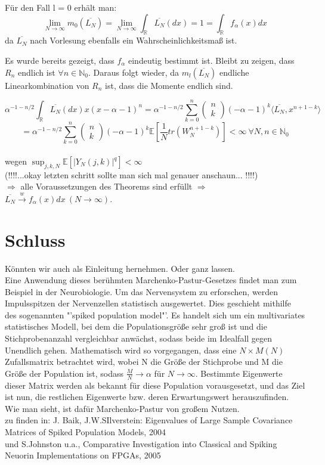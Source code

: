 \documentclass[a4paper, 11pt]{scrreprt}
\newcommand{\RR}{\mathbb{R}}
\newcommand{\EE}{\mathbb{E}}
\newcommand{\NN}{\mathbb{N}}
\begin{document}
Für den Fall l = 0 erhält man:
\[\lim_{N \to \infty} m_0(\overline{L_{N}}) 
= \lim_{N \to \infty} \int_\RR \overline{L_{N}}(dx) = 1 
= \int_\RR f_\alpha(x)dx\]
da $ \overline{L_N} $ nach Vorlesung ebenfalls ein Wahrscheinlichkeitsmaß ist.

Es wurde bereits gezeigt, dass $ f_\alpha $ eindeutig bestimmt ist. 
Bleibt zu zeigen, dass $ R_n $ endlich ist $ \forall n \in \NN_0 $. Daraus folgt wieder, da $ m_l(\overline{L_N}) $ endliche Linearkombination von $R_n$ ist, dass die Momente endlich sind.

 \[ \alpha^{-1-n/2} \int_{\RR}\overline{L_{N}}(dx)x(x-\alpha-1)^{n} = \alpha^{-1-n/2}\sum_{k=0}^n \begin{pmatrix} n\\k\end{pmatrix} (-\alpha -1)^k \langle \overline{L_N}, x^{n+1-k} \rangle \] 
\[= \alpha^{-1-n/2}\sum_{k=0}^n \begin{pmatrix} n\\k\end{pmatrix} (-\alpha -1)^k \EE [\dfrac{1}{N} tr(W_N^{n+1-k})]
< \infty ~\forall N,n \in \NN_0 \]\\
wegen $ \sup_{j,k,N} \EE[\vert Y_N(j,k)\vert ^{q}]< \infty$ \\
(!!!!...okay letzten schritt sollte man sich mal genauer anschaun... !!!!)\\
$ \Rightarrow $ alle Voraussetzungen des Theorems sind erfüllt $ \Rightarrow $  $ \overline{L_N} \overset{w}{\rightarrow} f_\alpha (x)dx~(N \rightarrow \infty) $. \\



\section*{Schluss}
Könnten wir auch als Einleitung hernehmen. Oder ganz lassen.\\
Eine Anwendung dieses berühmten Marchenko-Pastur-Gesetzes findet man zum Beispiel in der Neurobiologie. Um das Nervensystem zu erforschen, werden Impulsspitzen der Nervenzellen statistisch ausgewertet. Dies geschieht mithilfe des sogenannten "'spiked population model"'. Es handelt sich um ein multivariates statistisches Modell, bei dem die Populationsgröße sehr groß ist und die Stichprobenanzahl vergleichbar anwächst, sodass beide im Idealfall gegen Unendlich gehen. Mathematisch wird so vorgegangen, dass eine $ N \times M(N) $ Zufallsmatrix betrachtet wird, wobei N die Größe der Stichprobe und M die Größe der Population ist, sodass $ \frac{M}{N} \rightarrow \alpha$ für $N \rightarrow \infty $. Bestimmte Eigenwerte dieser Matrix werden als bekannt für diese Population vorausgesetzt, und das Ziel ist nun, die restlichen Eigenwerte bzw. deren Erwartungswert herauszufinden. Wie man sieht, ist dafür Marchenko-Pastur von großem Nutzen.\\

zu finden in: J. Baik, J.W.SIlverstein: Eigenvalues of Large Sample Covariance Matrices of Spiked Population Models, 2004\\
und S.Johnston u.a., Comparative Investigation into Classical and Spiking Neuorin Implementations on FPGAs, 2005
\end{document}
